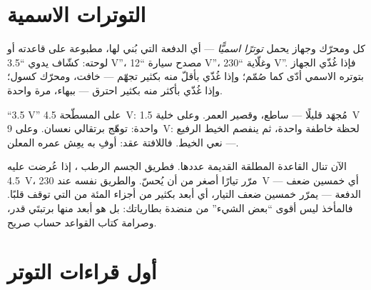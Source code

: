 \section{التوترات الاسمية}

\begin{definition}\label{def:g8:voltage-voltmeter:nominal}
كل  ومحرّك وجهاز يحمل \emph{توترًا اسميًّا} --- أي الدفعة التي بُني لها، مطبوعة على قاعدته أو
لوحته:  كشّاف يدوي ``3.5 V''،  مصدح سيارة
``12 V''، وغلّاية ``230 V''. فإذا غُذّي الجهاز بتوتره الاسمي
أدّى كما صُمّم؛ وإذا غُذّي بأقلّ منه بكثير تجهّم --- 
خافت، ومحرّك كسول؛ وإذا غُذّي بأكثر منه بكثير احترق --- ببهاء،
مرة واحدة.
\end{definition}

\begin{example}\label{ex:g8:voltage-voltmeter:matching}
 ``3.5 V'' على  المسطّحة \qty{4.5}{V}: مُجهَد
قليلًا --- ساطع، وقصير العمر. وعلى خلية \qty{1.5}{V} واحدة:
توهّج برتقالي نعسان. وعلى  \qty{9}{V}: لحظة خاطفة واحدة،
ثم ينفصم الخيط الرفيع --- نعي الخيط. فاللافتة عقد: أوفِ به
يعِش  عمره المعلن.
\end{example}

\begin{remark}\label{rem:g8:voltage-voltmeter:mains}
الآن تنال القاعدة المطلقة القديمة عددها. فطريق الجسم الرطب
، إذا عُرضت عليه \qty{4.5}{V}، مرّر تيارًا أصغر من أن
يُحسّ. والطريق نفسه عند \qty{230}{V} --- أي خمسين ضعف الدفعة
--- يمرّر خمسين ضعف التيار، أي أبعد بكثير من أجزاء المئة من
 التي توقف قلبًا. فالمأخذ ليس أقوى ``بعض الشيء'' من
منضدة بطارياتك: بل هو أبعد منها برتبتَي قدر، وصرامة كتاب
القواعد حساب صريح.
\end{remark}

\section{أول قراءات التوتر}

